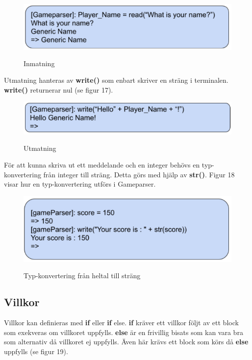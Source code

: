 \documentclass{Dokumentmall}
\begin{document}
\begin{figure}[h!]
  \centering
  \includegraphics[scale = 0.65]{Images/Figur16.png}
  \label{}
  \caption{Inmatning}
\end{figure}

\newpage
Utmatning hanteras av \textbf{write()} som enbart skriver en sträng i terminalen. \textbf{write()} returnerar nul (se figur 17).
\begin{figure}[h!]
  \centering
  \includegraphics[scale = 0.65]{Images/Figur17.png}
  \label{}
  \caption{Utmatning}
\end{figure}

För att kunna skriva ut ett meddelande och en integer behövs en typ-konvertering från integer till sträng. Detta görs med hjälp av \textbf{str()}. Figur 18 visar hur en typ-konvertering utförs i Gameparser.
\begin{figure}[h!]
  \centering
  \includegraphics[scale = 0.65]{Images/Figur18.png}
  \label{}
  \caption{Typ-konvertering från heltal till sträng}
\end{figure}

\subsection{Villkor}
Villkor kan definieras med \textbf{if} eller \textbf{if} else. \textbf{if} kräver ett villkor följt av ett block som exekveras om villkoret uppfylls. \textbf{else} är en frivillig bisats som kan vara bra som alternativ då villkoret ej uppfylls. Även här krävs ett block som körs då \textbf{else} uppfylls (se figur 19).
\end{document}
